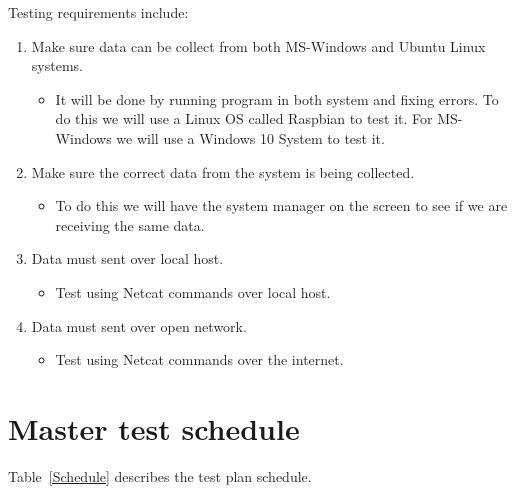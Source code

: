 \documentclass[letterpaper,12pt,oneside,listof=totoc]{scrreprt}
\begin{document}
Testing requirements include: 
\begin{enumerate}

\item  Make sure data can be collect from both MS-Windows and Ubuntu Linux
systems. 
    \begin{itemize}
    \item It will be done by running program in both system and fixing errors. To do this we will use a Linux OS called Raspbian to test it. For MS-Windows we will use a Windows 10 System to test it.
    \end{itemize}
    
\item  Make sure the correct data from the system is being collected. 
    \begin{itemize}
    \item To do this we will have the system manager on the screen to see if we are receiving the same data.
    \end{itemize}
    
\item  Data must sent over local host. 
    \begin{itemize}
    \item Test using Netcat commands over local host.
    \end{itemize}
    
\item  Data must sent over open network. 
    \begin{itemize}
    \item Test using Netcat commands over the internet.
    \end{itemize}

\end{enumerate}

\newpage
\section{Master test schedule}


Table~\ref{Schedule} describes the test plan schedule.
\end{document}
